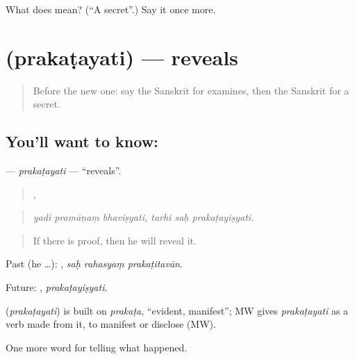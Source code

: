 \begin{tcolorbox}[breakable,colback=teal!4,colframe=teal!35!black,title={Before you move on}]
What does  mean? (\textquotedblleft{}A secret\textquotedblright{}.) Say it once more.
\end{tcolorbox}
\section[\texorpdfstring{\sk{प्रकटयति} (prakaṭayati)}{प्रकटयति (prakaṭayati)}]{ (prakaṭayati) — reveals}

\label{lesson:SA-C292-prakatayati}



\begin{quote}
Before the new one: say the Sanskrit for examines, then the Sanskrit for a secret.
\end{quote}

\subsection*{You'll want to know: }
\textbf{} — \emph{prakaṭayati} — \textquotedblleft{}reveals\textquotedblright{}.

\begin{quote}
  ,   
\end{quote}

\begin{quote}
\emph{yadi pramāṇaṃ bhaviṣyati, tarhi saḥ prakaṭayiṣyati.}
\end{quote}

\begin{quote}
If there is proof, then he will reveal it.
\end{quote}

Past (he …):   , \emph{saḥ rahasyaṃ prakaṭitavān}.

Future: , \emph{prakaṭayiṣyati}.

\begin{cousinweb}
\textbf{} (\emph{prakaṭayati}) is built on \emph{prakaṭa}, \textquotedblleft{}evident, manifest\textquotedblright{}; MW gives \emph{prakaṭayati} as a verb made from it, to manifest or disclose (MW).
\end{cousinweb}

\begin{grammarlens}[title={What you've built}]
One more word for telling what happened.
\end{grammarlens}

